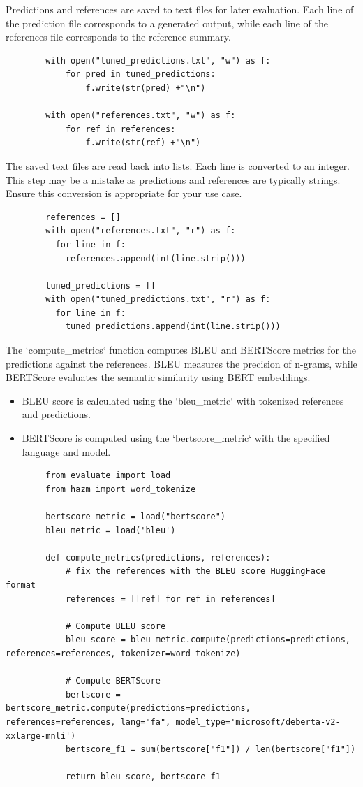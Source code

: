 \documentclass{solutionclass} %
\begin{document}
\begin{solution}
	Predictions and references are saved to text files for later evaluation. Each line of the prediction file corresponds to a generated output, while each line of the references file corresponds to the reference summary.
	\begin{lstlisting}
		with open("tuned_predictions.txt", "w") as f:
			for pred in tuned_predictions:
				f.write(str(pred) +"\n")
				
		with open("references.txt", "w") as f:
			for ref in references:
				f.write(str(ref) +"\n")
		\end{lstlisting}
\end{solution}

\begin{solution}
	The saved text files are read back into lists. Each line is converted to an integer. This step may be a mistake as predictions and references are typically strings. Ensure this conversion is appropriate for your use case.
	\begin{lstlisting}
		references = []
		with open("references.txt", "r") as f:
		  for line in f:
			references.append(int(line.strip()))
			
		tuned_predictions = []
		with open("tuned_predictions.txt", "r") as f:
		  for line in f:
			tuned_predictions.append(int(line.strip()))
		\end{lstlisting}
\end{solution}

\begin{solution}
	The `compute\_metrics` function computes BLEU and BERTScore metrics for the predictions against the references. BLEU measures the precision of n-grams, while BERTScore evaluates the semantic similarity using BERT embeddings.
	
	\begin{itemize}
		\item BLEU score is calculated using the `bleu\_metric` with tokenized references and predictions.
		\item BERTScore is computed using the `bertscore\_metric` with the specified language and model.
	\end{itemize}
	\begin{lstlisting}
		from evaluate import load
		from hazm import word_tokenize
		
		bertscore_metric = load("bertscore")
		bleu_metric = load('bleu')
		
		def compute_metrics(predictions, references):
			# fix the references with the BLEU score HuggingFace format
			references = [[ref] for ref in references]
		
			# Compute BLEU score
			bleu_score = bleu_metric.compute(predictions=predictions, references=references, tokenizer=word_tokenize)
		
			# Compute BERTScore
			bertscore = bertscore_metric.compute(predictions=predictions, references=references, lang="fa", model_type='microsoft/deberta-v2-xxlarge-mnli')
			bertscore_f1 = sum(bertscore["f1"]) / len(bertscore["f1"])
		
			return bleu_score, bertscore_f1
		\end{lstlisting}
\end{solution}
\end{document}
